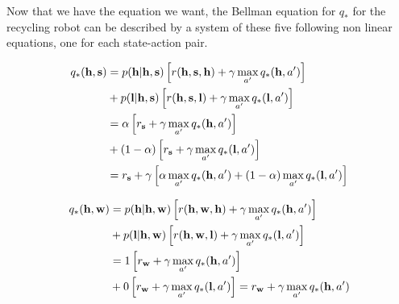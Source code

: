 \documentclass[10pt,a4paper]{article}
\begin{document}
Now that we have the equation we want, the Bellman equation for $q_*$ for the recycling robot can be described by a system of these five following non linear equations, one for each state-action pair.

\begin{equation}
\begin{split}
q_*(\textrm{\textbf{h}}, \textrm{\textbf{s}}) &= p(\textrm{\textbf{h}} \lvert \textrm{\textbf{h}}, \textrm{\textbf{s}}) \left[r(\textrm{\textbf{h}}, \textrm{\textbf{s}}, \textrm{\textbf{h}}) + \gamma \max_{a'} q_*(\textrm{\textbf{h}}, a')\right]\\
& + p(\textrm{\textbf{l}} \lvert \textrm{\textbf{h}}, \textrm{\textbf{s}}) \left[r(\textrm{\textbf{h}}, \textrm{\textbf{s}}, \textrm{\textbf{l}}) + \gamma \max_{a'} q_*(\textrm{\textbf{l}}, a')\right]\\
&= \alpha \left[r_\textrm{\textbf{s}} + \gamma \max_{a'} q_*(\textrm{\textbf{h}}, a')\right]\\
& + (1-\alpha) \left[r_\textrm{\textbf{s}} + \gamma \max_{a'} q_*(\textrm{\textbf{l}}, a')\right] \\
&= r_\textrm{\textbf{s}} + \gamma \left[\alpha \max_{a'} q_*(\textrm{\textbf{h}}, a') + (1-\alpha) \max_{a'} q_*(\textrm{\textbf{l}}, a')\right]
\end{split}
\end{equation}

\begin{equation}
\begin{split}
q_*(\textrm{\textbf{h}}, \textrm{\textbf{w}}) &= p(\textrm{\textbf{h}} \lvert \textrm{\textbf{h}}, \textrm{\textbf{w}}) \left[r(\textrm{\textbf{h}}, \textrm{\textbf{w}}, \textrm{\textbf{h}}) + \gamma \max_{a'} q_*(\textrm{\textbf{h}}, a')\right]\\
& + p(\textrm{\textbf{l}} \lvert \textrm{\textbf{h}}, \textrm{\textbf{w}}) \left[r(\textrm{\textbf{h}}, \textrm{\textbf{w}}, \textrm{\textbf{l}}) + \gamma \max_{a'} q_*(\textrm{\textbf{l}}, a')\right]\\
&= 1 \left[r_\textrm{\textbf{w}} + \gamma \max_{a'} q_*(\textrm{\textbf{h}}, a')\right]\\
& + 0 \left[r_\textrm{\textbf{w}} + \gamma \max_{a'} q_*(\textrm{\textbf{l}}, a')\right] =  r_\textrm{\textbf{w}} + \gamma \max_{a'} q_*(\textrm{\textbf{h}}, a')
\end{split}
\end{equation}
\end{document}
